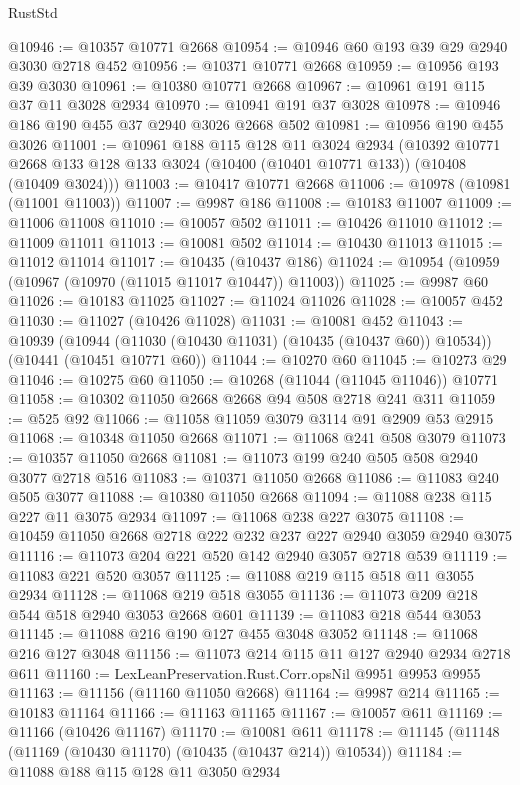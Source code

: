 \begin{lexlean}{RustStd}
\begin{coremodule}
@10946 := @10357 @10771 @2668
@10954 := @10946 @60 @193 @39 @29 @2940 @3030 @2718 @452
@10956 := @10371 @10771 @2668
@10959 := @10956 @193 @39 @3030
@10961 := @10380 @10771 @2668
@10967 := @10961 @191 @115 @37 @11 @3028 @2934
@10970 := @10941 @191 @37 @3028
@10978 := @10946 @186 @190 @455 @37 @2940 @3026 @2668 @502
@10981 := @10956 @190 @455 @3026
@11001 := @10961
    @188
    @115
    @128
    @11
    @3024
    @2934
    (@10392 @10771 @2668 @133 @128 @133 @3024 (@10400 (@10401 @10771 @133)) (@10408 (@10409 @3024)))
@11003 := @10417 @10771 @2668
@11006 := @10978 (@10981 (@11001 @11003))
@11007 := @9987 @186
@11008 := @10183 @11007
@11009 := @11006 @11008
@11010 := @10057 @502
@11011 := @10426 @11010
@11012 := @11009 @11011
@11013 := @10081 @502
@11014 := @10430 @11013
@11015 := @11012 @11014
@11017 := @10435 (@10437 @186)
@11024 := @10954 (@10959 (@10967 (@10970 (@11015 @11017 @10447)) @11003))
@11025 := @9987 @60
@11026 := @10183 @11025
@11027 := @11024 @11026
@11028 := @10057 @452
@11030 := @11027 (@10426 @11028)
@11031 := @10081 @452
@11043 := @10939
    (@10944 (@11030 (@10430 @11031) (@10435 (@10437 @60)) @10534))
    (@10441 (@10451 @10771 @60))
@11044 := @10270 @60
@11045 := @10273 @29
@11046 := @10275 @60
@11050 := @10268 (@11044 (@11045 @11046)) @10771
@11058 := @10302 @11050 @2668 @2668 @94 @508 @2718 @241 @311
@11059 := @525 @92
@11066 := @11058 @11059 @3079 @3114 @91 @2909 @53 @2915
@11068 := @10348 @11050 @2668
@11071 := @11068 @241 @508 @3079
@11073 := @10357 @11050 @2668
@11081 := @11073 @199 @240 @505 @508 @2940 @3077 @2718 @516
@11083 := @10371 @11050 @2668
@11086 := @11083 @240 @505 @3077
@11088 := @10380 @11050 @2668
@11094 := @11088 @238 @115 @227 @11 @3075 @2934
@11097 := @11068 @238 @227 @3075
@11108 := @10459 @11050 @2668 @2718 @222 @232 @237 @227 @2940 @3059 @2940 @3075
@11116 := @11073 @204 @221 @520 @142 @2940 @3057 @2718 @539
@11119 := @11083 @221 @520 @3057
@11125 := @11088 @219 @115 @518 @11 @3055 @2934
@11128 := @11068 @219 @518 @3055
@11136 := @11073 @209 @218 @544 @518 @2940 @3053 @2668 @601
@11139 := @11083 @218 @544 @3053
@11145 := @11088 @216 @190 @127 @455 @3048 @3052
@11148 := @11068 @216 @127 @3048
@11156 := @11073 @214 @115 @11 @127 @2940 @2934 @2718 @611
@11160 := LexLeanPreservation.Rust.Corr.opsNil @9951 @9953 @9955
@11163 := @11156 (@11160 @11050 @2668)
@11164 := @9987 @214
@11165 := @10183 @11164
@11166 := @11163 @11165
@11167 := @10057 @611
@11169 := @11166 (@10426 @11167)
@11170 := @10081 @611
@11178 := @11145 (@11148 (@11169 (@10430 @11170) (@10435 (@10437 @214)) @10534))
@11184 := @11088 @188 @115 @128 @11 @3050 @2934

\end{coremodule}
\end{lexlean}
